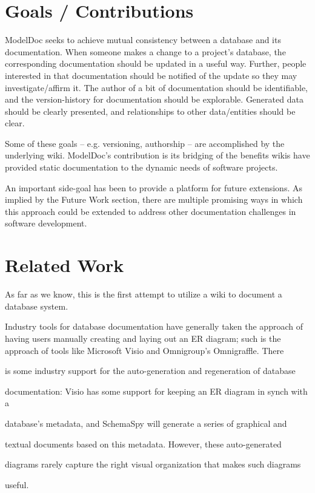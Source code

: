 \documentclass{acm_proc_article-sp}
\begin{document}
\section{Goals / Contributions}

ModelDoc seeks to achieve mutual consistency between a database and its
documentation.  When someone makes a change to a project's database, the
corresponding documentation should be updated in a useful way.  Further, people
interested in that documentation should be notified of the update so they may
investigate/affirm it.  The author of a bit of documentation should be
identifiable, and the version-history for documentation should be explorable. 
Generated data should be clearly presented, and relationships to other
data/entities should be clear.

Some of these goals -- e.g. versioning, authorship -- are accomplished by the
underlying wiki.  ModelDoc's contribution is its bridging of the benefits
wikis have provided static documentation to the dynamic needs of software
projects.

An important side-goal has been to provide a platform for future extensions. 
As implied by the Future Work section, there are multiple promising ways in
which this approach could be extended to address other documentation challenges
in software development.

\section{Related Work}
As far as we know, this is the first attempt to utilize a wiki to document a
database system.

Industry tools for database documentation have generally taken the approach of
having users manually creating and laying out an ER diagram; such is
the approach of tools like Microsoft Visio and Omnigroup's Omnigraffle.  There

is some industry support for the auto-generation and regeneration of database

documentation: Visio has some support for keeping an ER diagram in synch with a

database's metadata, and SchemaSpy will generate a series of graphical and

textual documents based on this metadata. However, these auto-generated

diagrams rarely capture the right visual organization that makes such diagrams

useful.
\end{document}
